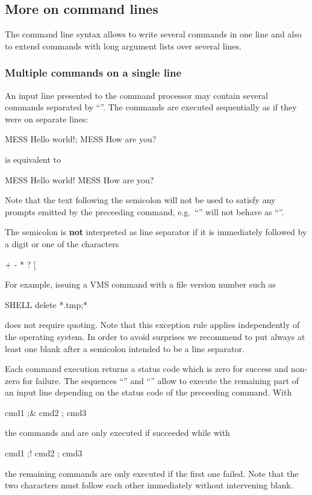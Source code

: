 \subsection{More on command lines}

The command line syntax allows to write several commands in one line
and also to extend commands with long argument
lists over several lines.


\subsubsection{Multiple commands on a single line\label{sec-mult-cmd}}

An input line presented to the \KUIP{} command processor may contain
several commands separated by ``\Lit{;}''.
The commands are executed sequentially as if they were on separate
lines:
\begin{XMP}
MESS Hello world!; MESS How are you?
\end{XMP}
is equivalent to
\begin{XMP}
MESS Hello world!
MESS How are you?
\end{XMP}
Note that the text following the semicolon will not be used to satisfy
any prompts emitted by the preceeding command, 
e.g.\ ``'' will not behave as 
``''.

The semicolon is \textbf{not} interpreted as line
separator if it is immediately followed by a digit or one of the
characters
\begin{XMP}
  +  - *  ?  [
\end{XMP}
For example, issuing a VMS command with a file version number such as
\begin{XMP}
SHELL delete *.tmp;*
\end{XMP}
does not require quoting.
Note that this exception rule applies independently of the operating
system.
In order to avoid surprises we recommend to put always at least one
blank after a semicolon intended to be a line separator.

Each command execution returns a status code which is zero for success
and non-zero for failure.
The sequences ``\Lit{;&}'' and ``\Lit{;!}'' allow to execute
the remaining part of an input line depending on the status code of
the preceeding command.
With
\begin{XMP}
cmd1 ;& cmd2 ; cmd3
\end{XMP}
the commands  and  are only executed if
 succeeded while with
\begin{XMP}
cmd1 ;! cmd2 ; cmd3
\end{XMP}
the remaining commands are only executed if the first one failed.
Note that the two characters must follow each other immediately
without intervening blank.


